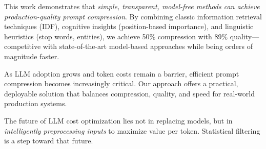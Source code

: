 This work demonstrates that \textit{simple, transparent, model-free methods can achieve production-quality prompt compression}. By combining classic information retrieval techniques (IDF), cognitive insights (position-based importance), and linguistic heuristics (stop words, entities), we achieve 50\% compression with 89\% quality—competitive with state-of-the-art model-based approaches while being orders of magnitude faster.

As LLM adoption grows and token costs remain a barrier, efficient prompt compression becomes increasingly critical. Our approach offers a practical, deployable solution that balances compression, quality, and speed for real-world production systems.

The future of LLM cost optimization lies not in replacing models, but in \textit{intelligently preprocessing inputs} to maximize value per token. Statistical filtering is a step toward that future.
